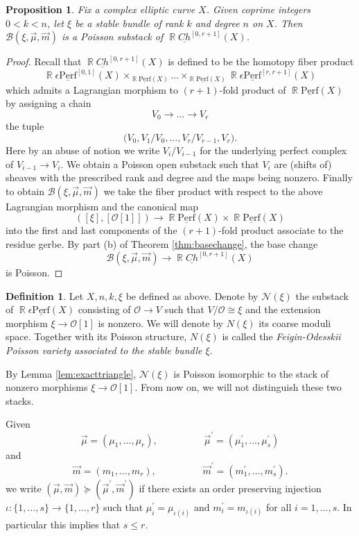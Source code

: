 \documentclass[reqno]{amsart}
\DeclareMathOperator\R{\mathbb R}
\newtheorem{prop}[theorem]{Proposition}
\theoremstyle{definition}
\newtheorem{definition}[theorem]{Definition}
\theoremstyle{remark}
\newcommand{\ul}{\underline}
\newcommand{\eps}{\epsilon}
\newcommand{\uperf}{\ul{\mathrm{Perf}}}
\newcommand{\cO}{\mathcal{O}}
\newcommand{\sB}{\mathscr{B}}
\newcommand{\sN}{\mathscr{N}}
\newcommand{\uchain}{\underline{Ch}}
\newcommand{\am}{\overrightarrow{m}}
\newcommand{\amu}{\overrightarrow{\mu}}
\numberwithin{equation}{section}
\begin{document}
\begin{prop}
Fix a complex elliptic curve $X$. 
Given coprime integers $0<k<n$, let $\xi$ be a stable bundle of rank $k$ and degree $n$ on $X$. Then $\sB(\xi, \amu,\am)$ is a Poisson substack of $\R\uchain^{[0,r+1]}(X)$.
\end{prop}
\begin{proof}
Recall that $\R\uchain^{[0,r+1]}(X)$ is defined to be the homotopy fiber product 
\[
\R\eps\uperf^{[0,1]}(X)\times_{\R\uperf(X)}\ldots \times_{\R\uperf(X)}\R\eps\uperf^{[r,r+1]}(X)
\] which admits a Lagrangian morphism to $(r+1)$-fold product of $\R\uperf(X)$ by assigning a chain
\[
V_0\to \ldots \to V_r
\] the tuple 
\[
\Big( V_0, V_1/V_0,\ldots, V_r/V_{r-1}, V_r\Big).
\] Here by an abuse of notion we write $V_i/V_{i-1}$ for the underlying perfect complex of $V_{i-1}\to V_{i}$.
We obtain a Poisson open substack such that 
$V_i$ are (shifts of) sheaves with the prescribed rank and degree and the maps being nonzero. Finally to obtain $\sB(\xi, \amu,\am)$ we take the fiber product with respect to the above Lagrangian morphism and the canonical map
\[
([\xi], [\cO[1]])\to \R\uperf(X)\times \R\uperf(X)
\] into the first and last components of the $(r+1)$-fold product associate to the residue gerbe. By  part (b) of Theorem \ref{thm:basechange}, the base change
\[
\sB(\xi, \amu,\am)\to \R\uchain^{[0,r+1]}(X)
\] is Poisson.
\end{proof}
\begin{definition}
Let $X,n,k, \xi$ be defined as above. Denote by $\sN(\xi)$ the substack of $\R\eps\uperf(X)$ consisting of $\cO\to V$ such that $V/\cO\cong \xi$ and the extension morphism $\xi\to \cO[1]$ is nonzero. We will denote by $N(\xi)$ its coarse moduli space. Together with its Poisson structure, $N(\xi)$ is called the \emph{Feigin-Odesskii Poisson variety associated to the stable bundle $\xi$}.
\end{definition}

By Lemma \ref{lem:exacttriangle}, $\sN(\xi)$ is Poisson isomorphic to the stack of nonzero morphisms $\xi\to \cO[1]$.
From now on, we will not distinguish these two stacks.

Given 
\[
\amu=(\mu_1,\ldots,\mu_r),\hspace{2cm} \amu^\prime=(\mu^\prime_1,\ldots,\mu^\prime_s)
\]  and
\[
\am=(m_1,\ldots,m_r),\hspace{2cm} \am^\prime=(m^\prime_1,\ldots,m^\prime_s).
\]
we write $(\amu,\am)\succeq(\amu^\prime,\am^\prime)$ if 
there exists an order preserving injection $\iota: \{1,\ldots,s\}\to \{1,\ldots,r\}$ such that $\mu^\prime_i=\mu_{\iota(i)}$ and $m^\prime_i=m_{\iota(i)}$ for all $i=1,\ldots,s$. In particular this implies that $s\leq r$. 
\end{document}
